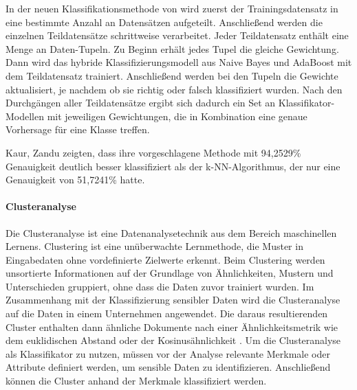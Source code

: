 In der neuen Klassifikationsmethode von \cite{Kaur.2016} wird zuerst der Trainingsdatensatz in eine bestimmte Anzahl an Datensätzen aufgeteilt. Anschließend werden die einzelnen Teildatensätze schrittweise verarbeitet. Jeder Teildatensatz enthält eine Menge an Daten-Tupeln. Zu Beginn erhält jedes Tupel die gleiche Gewichtung. Dann wird das hybride Klassifizierungsmodell aus Naive Bayes und AdaBoost mit dem Teildatensatz trainiert. Anschließend werden bei den Tupeln die Gewichte aktualisiert, je nachdem ob sie richtig oder falsch klassifiziert wurden. Nach den Durchgängen aller Teildatensätze ergibt sich dadurch ein Set an Klassifikator-Modellen mit jeweiligen Gewichtungen, die in Kombination eine genaue Vorhersage für eine Klasse treffen.

Kaur, Zandu \cite{Kaur.2016} zeigten, dass ihre vorgeschlagene Methode mit 94,2529\% Genauigkeit deutlich besser klassifiziert als der k-NN-Algorithmus, der nur eine Genauigkeit von 51,7241\% hatte.

\paragraph{Clusteranalyse}
Die Clusteranalyse ist eine Datenanalysetechnik aus dem Bereich maschinellen Lernens. Clustering ist eine unüberwachte Lernmethode, die Muster in Eingabedaten ohne vordefinierte Zielwerte erkennt. Beim Clustering werden unsortierte Informationen auf der Grundlage von Ähnlichkeiten, Mustern und Unterschieden gruppiert, ohne dass die Daten zuvor trainiert wurden. Im Zusammenhang mit der Klassifizierung sensibler Daten wird die Clusteranalyse auf die Daten in einem Unternehmen angewendet. Die daraus resultierenden Cluster enthalten dann ähnliche Dokumente nach einer Ähnlichkeitsmetrik wie dem euklidischen Abstand oder der Kosinusähnlichkeit \cite{Suyal.2014}.
Um die Clusteranalyse als Klassifikator zu nutzen, müssen vor der Analyse relevante Merkmale oder Attribute definiert werden, um sensible Daten zu identifizieren. Anschließend können die Cluster anhand der Merkmale klassifiziert werden.

